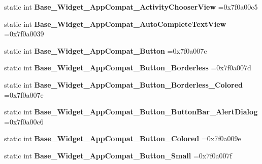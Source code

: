 \begin{DoxyCompactItemize}
static int {\bfseries Base\+\_\+\+Widget\+\_\+\+App\+Compat\+\_\+\+Activity\+Chooser\+View} =0x7f0a00c5
\item 
\mbox{\label{classandroid_1_1support_1_1v7_1_1appcompat_1_1R_1_1style_a882314d7e97f2e631987ff988495794e}} 
static int {\bfseries Base\+\_\+\+Widget\+\_\+\+App\+Compat\+\_\+\+Auto\+Complete\+Text\+View} =0x7f0a0039
\item 
\mbox{\label{classandroid_1_1support_1_1v7_1_1appcompat_1_1R_1_1style_af4ae5d2a0f4706b9410a0a720e4464ce}} 
static int {\bfseries Base\+\_\+\+Widget\+\_\+\+App\+Compat\+\_\+\+Button} =0x7f0a007c
\item 
\mbox{\label{classandroid_1_1support_1_1v7_1_1appcompat_1_1R_1_1style_aea1e31a7942bfc1f5985f8b32acb67c7}} 
static int {\bfseries Base\+\_\+\+Widget\+\_\+\+App\+Compat\+\_\+\+Button\+\_\+\+Borderless} =0x7f0a007d
\item 
\mbox{\label{classandroid_1_1support_1_1v7_1_1appcompat_1_1R_1_1style_a956eb4c7b9a57e0762cfe4fa1067cd05}} 
static int {\bfseries Base\+\_\+\+Widget\+\_\+\+App\+Compat\+\_\+\+Button\+\_\+\+Borderless\+\_\+\+Colored} =0x7f0a007e
\item 
\mbox{\label{classandroid_1_1support_1_1v7_1_1appcompat_1_1R_1_1style_a68bf5b9aa4c415d24d4f98e231dfb13d}} 
static int {\bfseries Base\+\_\+\+Widget\+\_\+\+App\+Compat\+\_\+\+Button\+\_\+\+Button\+Bar\+\_\+\+Alert\+Dialog} =0x7f0a00c6
\item 
\mbox{\label{classandroid_1_1support_1_1v7_1_1appcompat_1_1R_1_1style_ae06aaede23d7ffe6abea80475416c6f0}} 
static int {\bfseries Base\+\_\+\+Widget\+\_\+\+App\+Compat\+\_\+\+Button\+\_\+\+Colored} =0x7f0a009e
\item 
\mbox{\label{classandroid_1_1support_1_1v7_1_1appcompat_1_1R_1_1style_a80211decd4296c25000b7ba796cac6be}} 
static int {\bfseries Base\+\_\+\+Widget\+\_\+\+App\+Compat\+\_\+\+Button\+\_\+\+Small} =0x7f0a007f

\end{DoxyCompactItemize}
